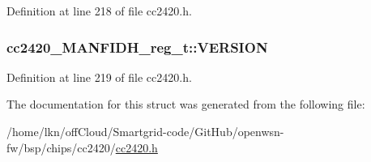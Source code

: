 Definition at line 218 of file cc2420.\+h.

\subsubsection[{\texorpdfstring{V\+E\+R\+S\+I\+ON}{VERSION}}]{ cc2420\+\_\+\+M\+A\+N\+F\+I\+D\+H\+\_\+reg\+\_\+t\+::\+V\+E\+R\+S\+I\+ON}\hypertarget{structcc2420___m_a_n_f_i_d_h__reg__t_a86eb910c04dd60413d0c00799f565ffd}{}\label{structcc2420___m_a_n_f_i_d_h__reg__t_a86eb910c04dd60413d0c00799f565ffd}


Definition at line 219 of file cc2420.\+h.



The documentation for this struct was generated from the following file\+:\begin{DoxyCompactItemize}
\item 
/home/lkn/off\+Cloud/\+Smartgrid-\/code/\+Git\+Hub/openwsn-\/fw/bsp/chips/cc2420/\hyperlink{cc2420_8h}{cc2420.\+h}\end{DoxyCompactItemize}
